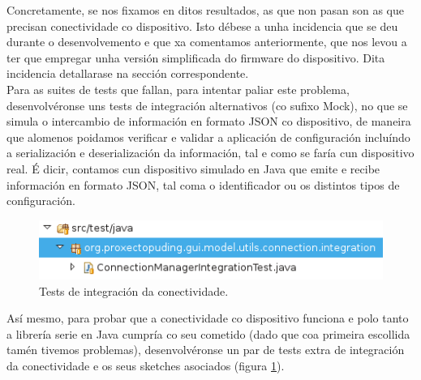  Concretamente, se nos fixamos en ditos resultados, as que non pasan son as
 que precisan conectividade co dispositivo. Isto débese a unha incidencia que se
 deu durante o desenvolvemento e que xa comentamos anteriormente, que nos levou
 a ter que empregar unha versión simplificada do firmware do dispositivo. Dita
 incidencia detallarase na sección correspondente. \\
 
 Para as suites de tests que fallan, para intentar paliar este problema,
 desenvolvéronse uns tests de integración alternativos (co sufixo Mock), no que
 se simula o intercambio de información en formato JSON co dispositivo, de
 maneira que alomenos poidamos verificar e validar a aplicación de configuración
 incluíndo a serialización e deserialización da información, tal e como se faría
 cun dispositivo real. É dicir, contamos cun dispositivo simulado en Java que
 emite e recibe información en formato JSON, tal coma o identificador ou os
 distintos tipos de configuración. \\
 
 \begin{figure}[htbp]
  \centering
  \includegraphics[scale=0.8,keepaspectratio=true]{./imagenes/tests-integracion-conectividade.png}
  \caption{Tests de integración da conectividade.}
  \label{figura:TestsIntegracionConectividade}
 \end{figure}
  
 Así mesmo, para probar que a conectividade co dispositivo funciona e polo
 tanto a librería serie en Java cumpría co seu cometido (dado que coa primeira
 escollida tamén tivemos problemas), desenvolvéronse un par de tests extra de
 integración da conectividade e os seus sketches asociados (figura
 \ref{figura:TestsIntegracionConectividade}). \\
  
